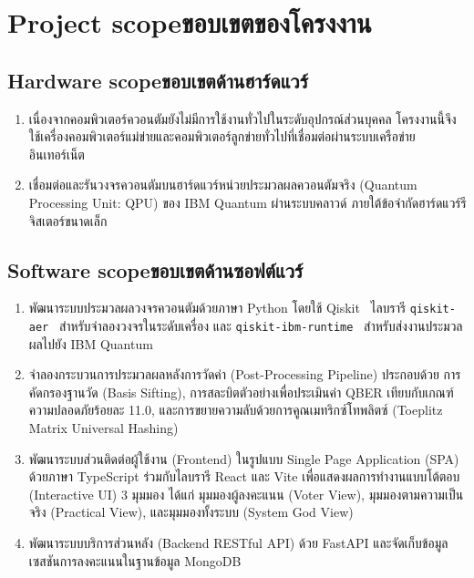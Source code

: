 \section{\ifenglish Project scope\else ขอบเขตของโครงงาน\fi}

\subsection{\ifenglish Hardware scope\else ขอบเขตด้านฮาร์ดแวร์\fi}
\begin{enumerate}
    \item เนื่องจากคอมพิวเตอร์ควอนตัมยังไม่มีการใช้งานทั่วไปในระดับอุปกรณ์ส่วนบุคคล โครงงานนี้จึงใช้เครื่องคอมพิวเตอร์แม่ข่ายและคอมพิวเตอร์ลูกข่ายทั่วไปที่เชื่อมต่อผ่านระบบเครือข่ายอินเทอร์เน็ต
    \item เชื่อมต่อและรันวงจรควอนตัมบนฮาร์ดแวร์หน่วยประมวลผลควอนตัมจริง (Quantum Processing Unit: QPU) ของ IBM Quantum ผ่านระบบคลาวด์ ภายใต้ข้อจำกัดฮาร์ดแวร์รีจิสเตอร์ขนาดเล็ก
\end{enumerate}

\subsection{\ifenglish Software scope\else ขอบเขตด้านซอฟต์แวร์\fi}
\begin{enumerate}
    \item พัฒนาระบบประมวลผลวงจรควอนตัมด้วยภาษา Python โดยใช้ Qiskit~\cite{qiskit2024} ไลบรารี \texttt{qiskit-aer}~\cite{qiskit_aer} สำหรับจำลองวงจรในระดับเครื่อง และ \texttt{qiskit-ibm-runtime}~\cite{qiskit_ibm_runtime} สำหรับส่งงานประมวลผลไปยัง IBM Quantum
    \item จำลองกระบวนการประมวลผลหลังการวัดค่า (Post-Processing Pipeline) ประกอบด้วย การคัดกรองฐานวัด (Basis Sifting), การสละบิตตัวอย่างเพื่อประเมินค่า QBER เทียบกับเกณฑ์ความปลอดภัยร้อยละ 11.0, และการขยายความลับด้วยการคูณเมทริกซ์โทพลิตซ์ (Toeplitz Matrix Universal Hashing)
    \item พัฒนาระบบส่วนติดต่อผู้ใช้งาน (Frontend) ในรูปแบบ Single Page Application (SPA) ด้วยภาษา TypeScript ร่วมกับไลบรารี React และ Vite เพื่อแสดงผลการทำงานแบบโต้ตอบ (Interactive UI) 3 มุมมอง ได้แก่ มุมมองผู้ลงคะแนน (Voter View), มุมมองตามความเป็นจริง (Practical View), และมุมมองทั้งระบบ (System God View)
    \item พัฒนาระบบบริการส่วนหลัง (Backend RESTful API) ด้วย FastAPI และจัดเก็บข้อมูลเซสชันการลงคะแนนในฐานข้อมูล MongoDB
\end{enumerate}

